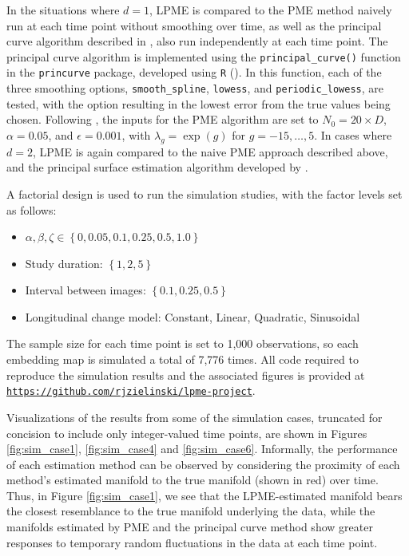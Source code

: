 \documentclass[11pt,reqno]{article}
\theoremstyle{definition}
\begin{document}
In the situations where $d = 1$, LPME is compared to the PME method naively run at each time point without smoothing over time, as well as the principal curve algorithm described in \cite{hastiePrincipalCurves1989}, also run independently at each time point. The principal curve algorithm is implemented using the \texttt{principal\_curve()} function in the \texttt{princurve} package, developed using \texttt{R} (\cite{rSoftware2023}). In this function, each of the three smoothing options, \texttt{smooth\_spline}, \texttt{lowess}, and \texttt{periodic\_lowess}, are tested, with the option resulting in the lowest error from the true values being chosen. Following \cite{mengPrincipalManifoldEstimation2021}, the inputs for the PME algorithm are set to $N_0 = 20 \times D$, $\alpha = 0.05$, and $\epsilon = 0.001$, with $\lambda_g = \exp(g)$ for $g = -15, \dots, 5$. In cases where $d = 2$, LPME is again compared to the naive PME approach described above, and the principal surface estimation algorithm developed by \cite{yueParameterizationWhiteMatter2016}.

A factorial design is used to run the simulation studies, with the factor levels set as follows:
\begin{itemize}
  \item $\alpha, \beta, \zeta \in \left\{0, 0.05, 0.1, 0.25, 0.5, 1.0\right\}$
  \item Study duration: $\left\{1, 2, 5\right\}$
  \item Interval between images: $\left\{0.1, 0.25, 0.5\right\}$
  \item Longitudinal change model: Constant, Linear, Quadratic, Sinusoidal
\end{itemize}
The sample size for each time point is set to 1,000 observations, so each embedding map is simulated a total of 7,776 times. All code required to reproduce the simulation results and the associated figures is provided at \href{https://github.com/rjzielinski/lpme-project}{\texttt{https://github.com/rjzielinski/lpme-project}}.

Visualizations of the results from some of the simulation cases, truncated for concision to include only integer-valued time points, are shown in Figures \ref{fig:sim_case1}, \ref{fig:sim_case4} and \ref{fig:sim_case6}. Informally, the performance of each estimation method can be observed by considering the proximity of each method's estimated manifold to the true manifold (shown in red) over time. Thus, in Figure \ref{fig:sim_case1}, we see that the LPME-estimated manifold bears the closest resemblance to the true manifold underlying the data, while the manifolds estimated by PME and the principal curve method show greater responses to temporary random fluctuations in the data at each time point.
\end{document}
